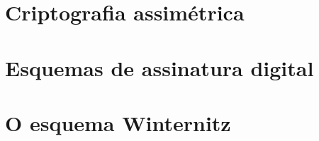 \documentclass{article}
\begin{document}









\section*{Criptografia assimétrica}

\section*{Esquemas de assinatura digital}

\section*{O esquema Winternitz}


 
\end{document}
